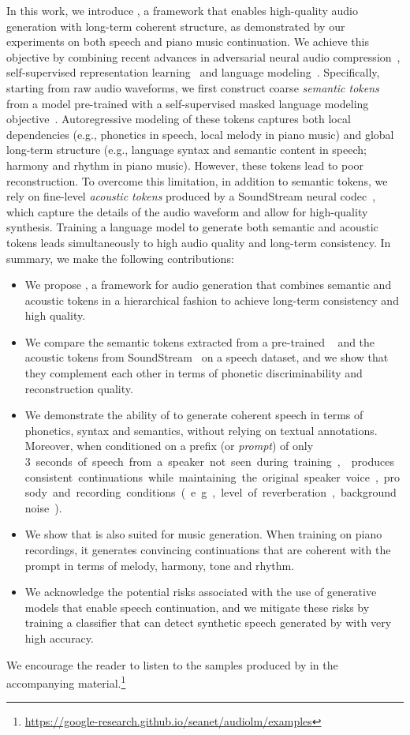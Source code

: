 \documentclass[letterpaper,10 pt]{IEEEtran}
\begin{document}
In this work, we introduce \ours{}, a framework that enables high-quality audio generation with long-term coherent structure, as demonstrated by our experiments on both speech and piano music continuation. We achieve this objective by combining recent advances in adversarial neural audio compression~\cite{soundstream}, self-supervised representation learning~\cite{w2vbert} and language modeling~\cite{roberts2022t5x}. Specifically, starting from raw audio waveforms, we first construct coarse \emph{semantic tokens} from a model pre-trained with a self-supervised masked language modeling objective~\cite{bert}. 
Autoregressive modeling of these tokens captures both local dependencies (e.g., phonetics in speech, local melody in piano music) and global long-term structure (e.g., language syntax and semantic content in speech; harmony and rhythm in piano music). However, these tokens lead to poor reconstruction.
To overcome this limitation, in addition to semantic tokens, we rely on fine-level \emph{acoustic tokens} produced by a SoundStream neural codec~\cite{soundstream}, which capture the details of the audio waveform and allow for high-quality synthesis. Training a language model to generate both semantic and acoustic tokens leads simultaneously to high audio quality and long-term consistency. In summary, we make the following contributions:
\begin{itemize}
    \item {} We propose \ours{}, a framework for audio generation that combines semantic and acoustic tokens in a hierarchical fashion to achieve long-term consistency and high quality.
    \item We compare the semantic tokens extracted from a pre-trained \wvbert~\cite{w2vbert} and the acoustic tokens from SoundStream~\cite{soundstream} on a speech dataset, and we show that they complement each other in terms of phonetic discriminability and reconstruction quality.
    \item We demonstrate the ability of \ours{} to generate coherent speech in terms of phonetics, syntax and semantics, without relying on textual annotations. Moreover, when conditioned on a prefix (or \textit{prompt}) of only \SI{3}~seconds of speech from a speaker not seen during training, \ours{} produces consistent continuations while maintaining the original speaker voice, prosody and recording conditions (e.g., level of reverberation, background noise).
    \item We show that \ours{} is also suited for music generation. When training on piano recordings, it generates convincing continuations that are coherent with the prompt in terms of melody, harmony, tone and rhythm.
    \item We acknowledge the potential risks associated with the use of generative models that enable speech continuation, and we mitigate these risks by training a classifier that can detect synthetic speech generated by \ours{} with very high accuracy.
\end{itemize}
We encourage the reader to listen to the samples produced by \ours{} in the accompanying material.\footnote{\label{webpage}\url{https://google-research.github.io/seanet/audiolm/examples}}
\end{document}
